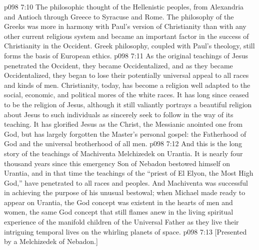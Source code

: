 \vs p098 7:10 \pc {}\bibnobreakspace The philosophic thought of the Hellenistic peoples, from Alexandria and Antioch through Greece to Syracuse and Rome. The philosophy of the Greeks was more in harmony with Paul’s version of Christianity than with any other current religious system and became an important factor in the success of Christianity in the Occident. Greek philosophy, coupled with Paul’s theology, still forms the basis of European ethics.
\vs p098 7:11 \pc As the original teachings of Jesus penetrated the Occident, they became Occidentalized, and as they became Occidentalized, they began to lose their potentially universal appeal to all races and kinds of men. Christianity, today, has become a religion well adapted to the social, economic, and political mores of the white races. It has long since ceased to be the religion of Jesus, although it still valiantly portrays a beautiful religion about Jesus to such individuals as sincerely seek to follow in the way of its teaching. It has glorified Jesus as the Christ, the Messianic anointed one from God, but has largely forgotten the Master’s personal gospel: the Fatherhood of God and the universal brotherhood of all men.
\vs p098 7:12 \pc And this is the long story of the teachings of Machiventa Melchizedek on Urantia. It is nearly four thousand years since this emergency Son of Nebadon bestowed himself on Urantia, and in that time the teachings of the “priest of El Elyon, the Most High God,” have penetrated to all races and peoples. And Machiventa was successful in achieving the purpose of his unusual bestowal; when Michael made ready to appear on Urantia, the God concept was existent in the hearts of men and women, the same God concept that still flames anew in the living spiritual experience of the manifold children of the Universal Father as they live their intriguing temporal lives on the whirling planets of space.
\vsetoff
\vs p098 7:13 [Presented by a Melchizedek of Nebadon.]
